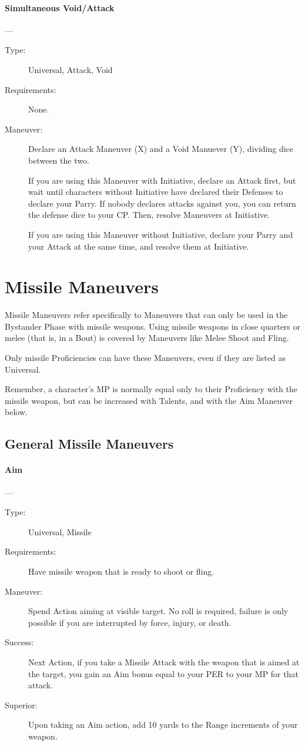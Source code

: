 \documentclass[oneside,11pt,english]{book}
\begin{document}
\paragraph{\large\label{man:Simultaneous Void/Attack}Simultaneous Void/Attack}---\quad{\large[X+Y+2]}
\vspace{-10pt}\begin{description} 
\item [Type:] Universal, Attack, Void 
\item [Requirements:] None. 
\item [Maneuver:] Declare an Attack Maneuver (X) and a Void Manuever (Y), dividing dice between the two. 

If you are using this Maneuver with Initiative, declare an Attack first, but wait until characters without Initiative have declared their Defenses to declare your Parry. If nobody declares attacks against you, you can return the defense dice to your CP. Then, resolve Maneuvers at Initiative.

If you are using this Maneuver without Initiative, declare your Parry and your Attack at the same time, and resolve them at Initiative. 
\end{description}
\section{Missile Maneuvers}
Missile Maneuvers refer specifically to Maneuvers that can only be used in the Bystander Phase with 
missile weapons. Using missile weapons in close quarters or melee (that is, in a Bout) is covered by 
Maneuvers like Melee Shoot and Fling. 

Only missile Proficiencies can have these Maneuvers, even if they are listed as Universal. 

Remember, a character’s MP is normally equal only to their Proficiency with the missile weapon, but can 
be increased with Talents, and with the Aim Maneuver below. 
\subsection{General Missile Maneuvers}
\paragraph{\large\label{man:Aim}Aim}---\quad{\large[0]}
\vspace{-10pt}\begin{description} 
\item [Type:] Universal, Missile 
\item [Requirements:] Have missile weapon that is ready to shoot or fling. 
\item [Maneuver:] Spend Action aiming at visible target. No roll is required, failure is only possible if you are 
interrupted by force, injury, or death. 
\item [Success:] Next Action, if you take a Missile Attack with the weapon that is aimed at the target, you gain 
an Aim bonus equal to your PER to your MP for that attack. 
\item [Superior:] Upon taking an Aim action, add 10 yards to the Range increments of your weapon. 
\end{description}
\end{document}
